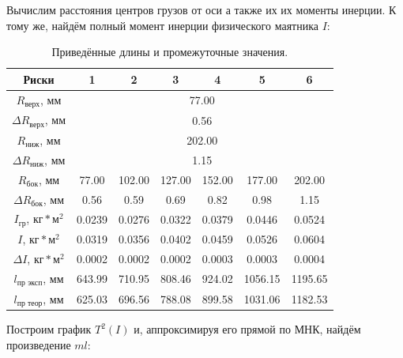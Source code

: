 \documentclass[12pt, a4paper]{article}
\begin{document}
Вычислим расстояния центров грузов от оси а также их их моменты инерции. К тому же, найдём полный момент инерции физического маятника $I$:


\begin{table}[H]
\begin{center}
\begin{tabular}{|c|c|c|c|c|c|c|}
\hline 
Риски & 1 &  2 & 3 & 4 & 5 & 6\\ 
\hline 
$R_\text{верх}$, мм & \multicolumn{6}{c|}{77.00}\\ 
\hline 
$\Delta R_\text{верх}$, мм & \multicolumn{6}{c|}{0.56}\\ 
\hline 
$R_\text{ниж}$, мм & \multicolumn{6}{c|}{202.00}\\ 
\hline 
$\Delta R_\text{ниж}$, мм & \multicolumn{6}{c|}{1.15}\\ 
\hline 
$R_\text{бок}$, мм & 77.00 & 102.00 & 127.00 & 152.00 & 177.00 & 202.00\\ 
\hline 
$\Delta R_\text{бок}$, мм & 0.56 & 0.59 & 0.69 & 0.82 & 0.98 & 1.15\\ 
\hline 
$I_\text{гр}$, $\text{кг}*\text{м}^2$ & 0.0239 & 0.0276 & 0.0322 & 0.0379 & 0.0446 & 0.0524\\ 
\hline 
$I$, $\text{кг}*\text{м}^2$ & 0.0319 & 0.0356 & 0.0402 & 0.0459 & 0.0526 & 0.0604\\ 
\hline 
$\Delta I$, $\text{кг}*\text{м}^2$ & 0.0002 & 0.0002 & 0.0002 & 0.0003 & 0.0003 & 0.0004\\ 
\hline 
$l_\text{пр эксп}$, мм & 643.99 & 710.95 & 808.46 & 924.02 & 1056.15 & 1195.65\\ 
\hline 
$l_\text{пр теор}$, мм & 625.03 & 696.56 & 788.08 & 899.58 & 1031.06 & 1182.53\\ 
\hline 



\end{tabular}
\caption{Приведённые длины и промежуточные значения.}
\label{tab:4}
\end{center}

\end{table}

Построим график $T^2(I)$ и, аппроксимируя его прямой по МНК, найдём произведение $ml$:
\end{document}
